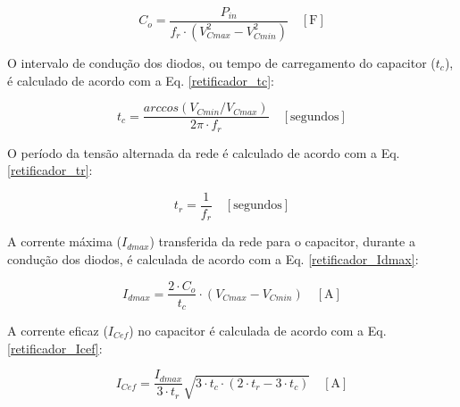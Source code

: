 \begin{apendicesenv}
    \begin{equation}
        C_{o} = \frac{P_{in}}{f_{r} \cdot \left( V_{Cmax}^{2} - V_{Cmin}^{2} \right)} \quad [\text{F}]
        \label{retificador_C}
    \end{equation}
    

O intervalo de condução dos diodos, ou tempo de carregamento do capacitor ($t_{c}$), é calculado de acordo com a Eq. \ref{retificador_tc}:
    
    \begin{equation}
        t_{c} = \frac{arc cos(V_{Cmin}/V_{Cmax})}{2 \pi \cdot f_{r}} \quad [\text{segundos}]
        \label{retificador_tc}
    \end{equation}
    
O período da tensão alternada da rede é calculado de acordo com a Eq. \ref{retificador_tr}:
    
    \begin{equation}
        t_{r} = \frac{1}{f_{r}} \quad [\text{segundos}]
        \label{retificador_tr}
    \end{equation}

A corrente máxima ($I_{dmax}$) transferida da rede para o capacitor, durante a condução dos diodos, é calculada de acordo com a Eq. \ref{retificador_Idmax}:

    \begin{equation}
        I_{dmax} = \frac{2 \cdot C_{o}}{t_{c}} \cdot \left( V_{Cmax} - V_{Cmin} \right) \quad [\text{A}]
        \label{retificador_Idmax}
    \end{equation}
    
A corrente eficaz ($I_{Cef}$) no capacitor é calculada de acordo com a Eq. \ref{retificador_Icef}:
    
    \begin{equation}
        I_{Cef} = \frac{I_{dmax}}{3 \cdot t_{r}} \sqrt{3 \cdot t_{c} \cdot \left( 2 \cdot t_{r} - 3 \cdot t_{c} \right) } \quad [\text{A}]
        \label{retificador_Icef}
    \end{equation}
    
    
    

\end{apendicesenv}
